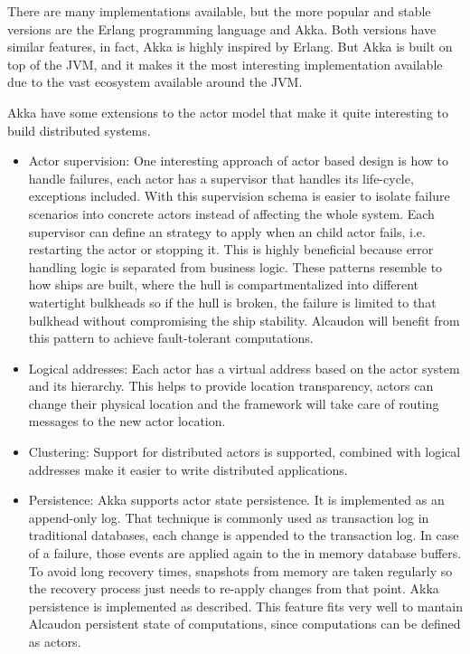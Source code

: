 There are many implementations available\cite{wikiactor}, but the more popular
and stable versions are the Erlang programming language and Akka. Both versions
have similar features, in fact, Akka is highly inspired by Erlang. But Akka is
built on top of the JVM, and it makes it the most interesting implementation
available due to the vast ecosystem available around the JVM.

Akka have some extensions to the actor model that make it quite interesting to
build distributed systems.
\begin{itemize}
\item Actor supervision: One interesting approach of actor based design is how
  to handle failures, each actor has a supervisor that handles its life-cycle,
  exceptions included. With this supervision schema is easier to isolate failure
  scenarios into concrete actors instead of affecting the whole system. Each
  supervisor can define an strategy to apply when an child actor fails, i.e.
  restarting the actor or stopping it. This is highly beneficial because error
  handling logic is separated from business logic. These patterns resemble to
  how ships are built, where the hull is compartmentalized into different watertight
  bulkheads so if the hull is broken, the failure is limited to that bulkhead without
  compromising the ship stability. Alcaudon will benefit from this pattern to achieve
  fault-tolerant computations.
\item Logical addresses: Each actor has a virtual address based on the actor
  system and its hierarchy. This helps to provide location transparency, actors can
  change their physical location and the framework will take care of routing
  messages to the new actor location.
\item Clustering: Support for distributed actors is supported, combined with
  logical addresses make it easier to write distributed applications.
\item Persistence: Akka supports actor state persistence. It is implemented as
  an append-only log. That technique is commonly used as transaction log in
  traditional databases, each change is appended to the transaction log. In case
  of a failure, those events are applied again to the in memory database
  buffers. To avoid long recovery times, snapshots from memory are taken
  regularly so the recovery process just needs to re-apply changes from that
  point. Akka persistence is implemented as described. This feature fits very
  well to mantain Alcaudon persistent state of computations, since computations
  can be defined as actors.
\end{itemize}

